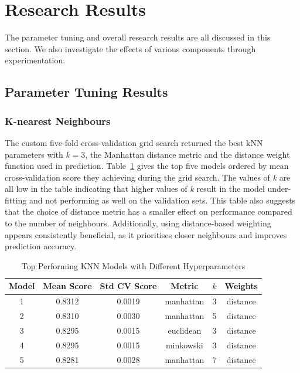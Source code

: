 \documentclass[10pt, conference]{IEEEtran}
\begin{document}
\section{Research Results}
The parameter tuning and overall research results are all discussed in this section. We also investigate the effects of various components through experimentation.
\subsection{Parameter Tuning Results}
\subsubsection{K-nearest Neighbours}
The custom five-fold cross-validation grid search returned the best kNN parameters with $k=3$, the Manhattan distance metric and the distance weight function used in prediction. Table~\ref{tab:knn_comparison} gives the top five models ordered by mean cross-validation score they achieving during the grid search. The values of \textit{k} are all low in the table indicating that higher values of \textit{k} result in the model under-fitting and not performing as well on the validation sets. This table also suggests that the choice of distance metric has a smaller effect on performance compared to the number of neighbours. Additionally, using distance-based weighting appears consistently beneficial, as it prioritises closer neighbours and improves prediction accuracy.

\begin{table}[htbp]
	\caption{Top Performing KNN Models with Different Hyperparameters}
	\centering
	\begin{tabular}{|c|c|c|c|c|c|}
		\hline
		\textbf{Model} & \textbf{Mean Score} & \textbf{Std CV Score} & \textbf{Metric} & \textbf{$k$} & \textbf{Weights} \\ \hline
		1 & 0.8312 & 0.0019 & manhattan & 3 & distance \\ \hline
		2 & 0.8310 & 0.0030 & manhattan & 5 & distance \\ \hline
		3 & 0.8295 & 0.0015 & euclidean & 3 & distance \\ \hline
		4 & 0.8295 & 0.0015 & minkowski & 3 & distance \\ \hline
		5 & 0.8281 & 0.0028 & manhattan & 7 & distance \\ \hline
	\end{tabular}
	\label{tab:knn_comparison}
\end{table}
\end{document}
